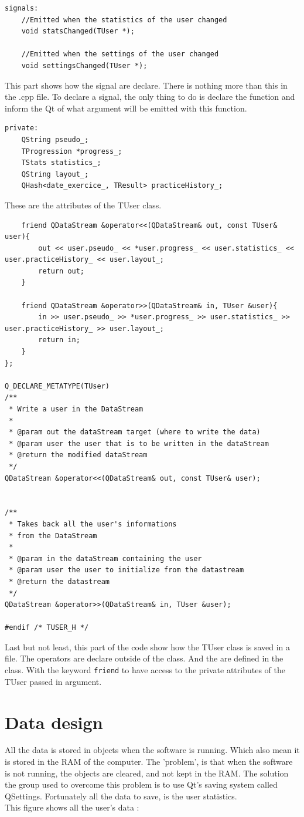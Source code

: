 \begin{lstlisting}
signals:
	//Emitted when the statistics of the user changed
    void statsChanged(TUser *);

	//Emitted when the settings of the user changed
    void settingsChanged(TUser *);
\end{lstlisting}
This part shows how the signal are declare. There is nothing more than this in the .cpp file. To declare a signal, the only thing to do is declare the function and inform the Qt of what argument will be emitted with this function.

\begin{lstlisting}
private:
    QString pseudo_;
    TProgression *progress_;
    TStats statistics_;
    QString layout_;
	QHash<date_exercice_, TResult> practiceHistory_;
\end{lstlisting}
These are the attributes of the TUser class.

\begin{lstlisting}
    friend QDataStream &operator<<(QDataStream& out, const TUser& user){
        out << user.pseudo_ << *user.progress_ << user.statistics_ << user.practiceHistory_ << user.layout_;
        return out;
    }

    friend QDataStream &operator>>(QDataStream& in, TUser &user){
        in >> user.pseudo_ >> *user.progress_ >> user.statistics_ >> user.practiceHistory_ >> user.layout_;
        return in;
    }
};

Q_DECLARE_METATYPE(TUser)
/**
 * Write a user in the DataStream
 * 
 * @param out the dataStream target (where to write the data)
 * @param user the user that is to be written in the dataStream
 * @return the modified dataStream
 */
QDataStream &operator<<(QDataStream& out, const TUser& user);


/**
 * Takes back all the user's informations
 * from the DataStream
 * 
 * @param in the dataStream containing the user
 * @param user the user to initialize from the datastream
 * @return the datastream
 */
QDataStream &operator>>(QDataStream& in, TUser &user);

#endif /* TUSER_H */

\end{lstlisting}
Last but not least, this part of the code show how the TUser class is saved in a file. The operators are declare outside of the class. And the are defined in the class. With the keyword \texttt{friend} to have access to the private attributes of the TUser passed in argument.

\chapter{Data design}
All the data is stored in objects when the software is running. Which also mean it is stored in the RAM of the computer.
The 'problem', is that when the software is not running, the objects are cleared, and not kept in the RAM. The solution the group used to overcome this problem is to use Qt's saving system called QSettings. Fortunately all the data to save, is the user statistics.\\
This figure shows all the user's data :

